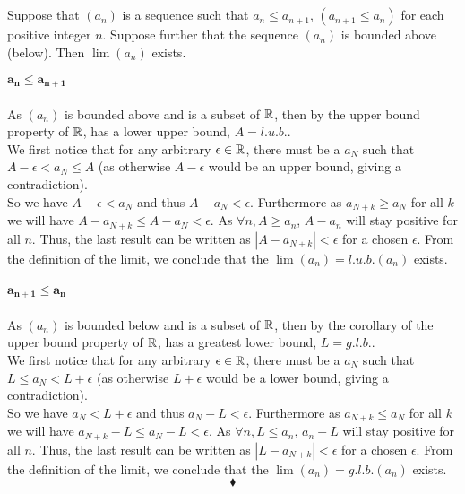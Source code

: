 
\renewcommand{\thesubsection}{\thesection.\arabic{subsection}}
\setcounter{subsection}{0}
\subsection{}
\begin{tcolorbox}
Suppose that $(a_n)$ is a sequence such that $a_n\leq a_{n+1}$, $(a_{n+1}\leq a_{n})$ for each positive integer $n$. Suppose further that the sequence $(a_n)$ is bounded above (below). Then $\lim (a_n)$ exists. 
\end{tcolorbox}
$$ $$ 
$\mathbf{a_n\leq a_{n+1}}$\\\\
As $(a_n)$ is bounded above and is a subset of $\mathbb{R}$, then by the upper bound property of $\mathbb{R}$, has a lower upper bound, $A=l.u.b.$.\\
We first notice that for any arbitrary $\epsilon\in \mathbb{R}$, there must be a $a_N$ such that $A-\epsilon < a_N\leq A$ (as otherwise $A-\epsilon$ would be an upper bound, giving a contradiction).\\
So we have $A-\epsilon < a_N$ and thus $A-a_N < \epsilon$.  Furthermore as $a_{N+k}\geq a_N$ for all $k$ we will have $A-a_{N+k}\leq A-a_N<\epsilon$.  As $\forall n, A\geq a_n $, $A-a_n$ will stay positive for all $n$. Thus, the last result can be written as $|A-a_{N+k}|<\epsilon$ for a chosen $\epsilon$. From the definition of the limit, we conclude that the $\lim (a_n)= l.u.b.(a_n)$ exists.\\\\
$\mathbf{a_{n+1}\leq a_{n}}$\\\\
As $(a_n)$ is bounded below  and is a subset of $\mathbb{R}$, then by the corollary of the upper bound property of $\mathbb{R}$, has a greatest lower bound, $L=g.l.b.$.\\
We first notice that for any arbitrary $\epsilon\in \mathbb{R}$, there must be a $a_N$ such that $L\leq a_N < L+\epsilon$ (as otherwise $L+\epsilon$ would be a lower bound, giving a contradiction).\\
So we have $a_N < L+\epsilon$ and thus $a_N -L < \epsilon$.  Furthermore as $a_{N+k}\leq a_N$ for all $k$ we will have $a_{N+k}-L\leq a_{N}-L<\epsilon$.  As $\forall n, L\leq a_n $, $a_n-L$ will stay positive for all $n$. Thus, the last result can be written as $|L-a_{N+k}|<\epsilon$ for a chosen $\epsilon$. From the definition of the limit, we conclude that the $\lim (a_n)= g.l.b.(a_n)$ exists.
$$\blacklozenge$$

